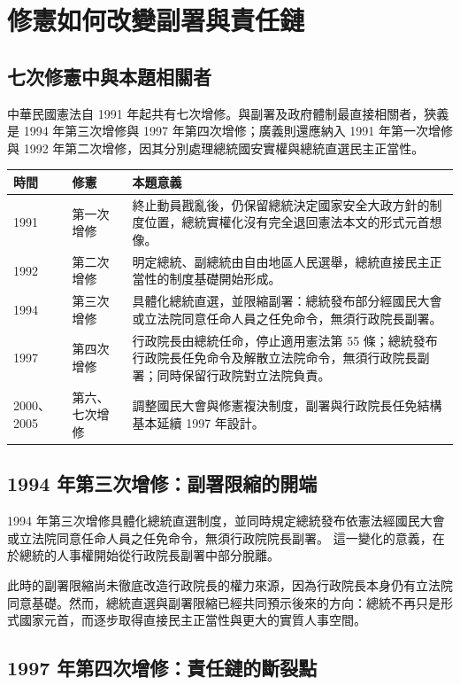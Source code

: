 \documentclass[12pt]{ctexart}
\begin{document}
\section{修憲如何改變副署與責任鏈}

\subsection{七次修憲中與本題相關者}

中華民國憲法自 1991 年起共有七次增修。與副署及政府體制最直接相關者，狹義是 1994 年第三次增修與 1997 年第四次增修；廣義則還應納入 1991 年第一次增修與 1992 年第二次增修，因其分別處理總統國安實權與總統直選民主正當性。

\begin{longtable}{p{2.2cm}p{3.2cm}p{8cm}}
\toprule
時間 & 修憲 & 本題意義 \\
\midrule
1991 & 第一次增修 & 終止動員戡亂後，仍保留總統決定國家安全大政方針的制度位置，總統實權化沒有完全退回憲法本文的形式元首想像。\\
1992 & 第二次增修 & 明定總統、副總統由自由地區人民選舉，總統直接民主正當性的制度基礎開始形成。\\
1994 & 第三次增修 & 具體化總統直選，並限縮副署：總統發布部分經國民大會或立法院同意任命人員之任免命令，無須行政院長副署。\\
1997 & 第四次增修 & 行政院長由總統任命，停止適用憲法第 55 條；總統發布行政院長任免命令及解散立法院命令，無須行政院長副署；同時保留行政院對立法院負責。\\
2000、2005 & 第六、七次增修 & 調整國民大會與修憲複決制度，副署與行政院長任免結構基本延續 1997 年設計。\\
\bottomrule
\end{longtable}

\subsection{1994 年第三次增修：副署限縮的開端}

1994 年第三次增修具體化總統直選制度，並同時規定總統發布依憲法經國民大會或立法院同意任命人員之任免命令，無須行政院院長副署。\autocite{president_third_amendment} 這一變化的意義，在於總統的人事權開始從行政院長副署中部分脫離。

此時的副署限縮尚未徹底改造行政院長的權力來源，因為行政院長本身仍有立法院同意基礎。然而，總統直選與副署限縮已經共同預示後來的方向：總統不再只是形式國家元首，而逐步取得直接民主正當性與更大的實質人事空間。

\subsection{1997 年第四次增修：責任鏈的斷裂點}
\end{document}
